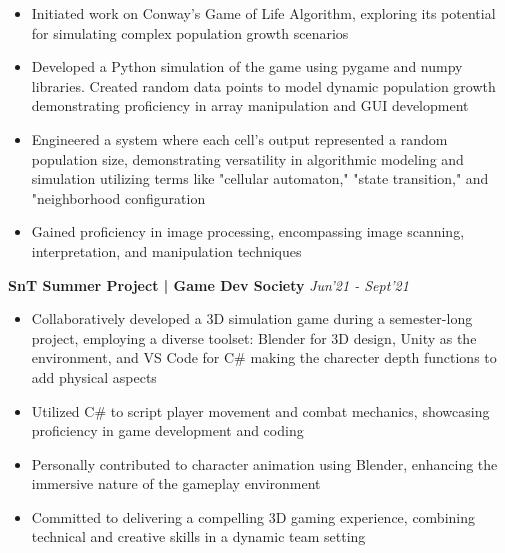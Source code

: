 \documentclass[10pt]{extarticle}
\begin{document}
{\begin{flushleft}
\begin{itemize}
    \item Initiated work on Conway's Game of Life Algorithm, exploring its potential for simulating complex population growth scenarios
    \item Developed a Python simulation of the game using pygame and numpy libraries. Created random data points to model dynamic population growth demonstrating proficiency in array manipulation and GUI development
    \item Engineered a system where each cell's output represented a random population size, demonstrating versatility in algorithmic modeling and simulation utilizing terms like "cellular automaton," "state transition," and "neighborhood configuration
    \item Gained proficiency in image processing, encompassing image scanning, interpretation, and manipulation techniques
\end{itemize}
\begin{tcolorbox}[center, width=20.7cm, colback=black!10]
\textbf{SnT Summer Project | Game Dev Society}  \hfill\hfill\textcolor{black!80}{\small \textit{Jun'21 - Sept'21}}
\end{tcolorbox}
\vspace{-10pt}
\begin{itemize}
\vspace{2.0mm}
    \item Collaboratively developed a 3D simulation game during a semester-long project, employing a diverse toolset: Blender for 3D design, Unity as the environment, and VS Code for C\# making the charecter depth functions to add physical aspects
    \item Utilized C\# to script player movement and combat mechanics, showcasing proficiency in game development and coding
    \item Personally contributed to character animation using Blender, enhancing the immersive nature of the gameplay environment
    \item Committed to delivering a compelling 3D gaming experience, combining technical and creative skills in a dynamic team setting

\end{itemize}
\smallskip{}
\vspace{-19pt}



\end{flushleft}}
\end{document}
